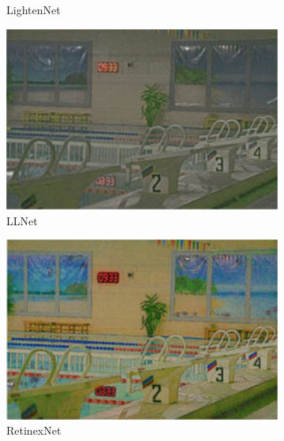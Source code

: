 \documentclass[a4paper]{ctexart}
\begin{document}
\begin{figure}[htb]
\begin{subfigure}{0.19\textwidth}
		\captionsetup{font=scriptsize}
		\caption{LightenNet}
		\label{fig: LightenNet}
	\end{subfigure}
	\begin{subfigure}{0.19\textwidth}
		\includegraphics[width=\linewidth]{picture/LLIE/Efficent/LLNet}
		\captionsetup{font=scriptsize}
		\caption{LLNet}
		\label{fig: LLNet}	
	\end{subfigure}
	\begin{subfigure}{0.19\textwidth}
		\includegraphics[width=\linewidth]{picture/LLIE/Efficent/RetinexNet}
		\captionsetup{font=scriptsize}
		\caption{RetinexNet}
		\label{fig: RetinexNet}	
	\end{subfigure}
	\begin{subfigure}{0.19\textwidth}

\end{subfigure}
\end{figure}
\end{document}
